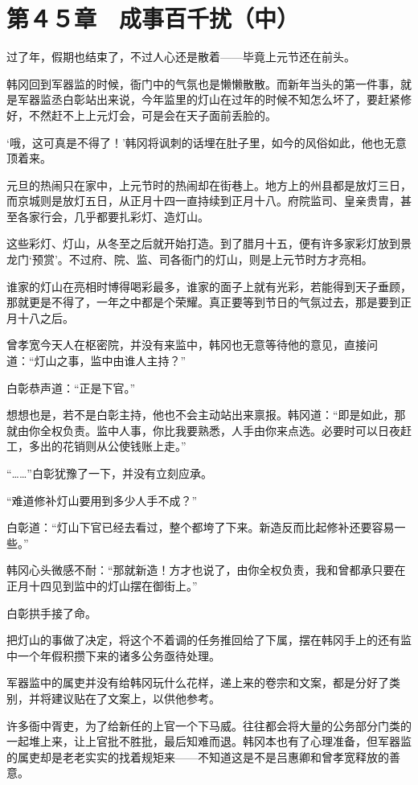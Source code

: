 \section{第４５章　成事百千扰（中）}

过了年，假期也结束了，不过人心还是散着——毕竟上元节还在前头。

韩冈回到军器监的时候，衙门中的气氛也是懒懒散散。而新年当头的第一件事，就是军器监丞白彰站出来说，今年监里的灯山在过年的时候不知怎么坏了，要赶紧修好，不然赶不上上元灯会，可是会在天子面前丢脸的。

‘哦，这可真是不得了！’韩冈将讽刺的话埋在肚子里，如今的风俗如此，他也无意顶着来。

元旦的热闹只在家中，上元节时的热闹却在街巷上。地方上的州县都是放灯三日，而京城则是放灯五日，从正月十四一直持续到正月十八。府院监司、皇亲贵胄，甚至各家行会，几乎都要扎彩灯、造灯山。

这些彩灯、灯山，从冬至之后就开始打造。到了腊月十五，便有许多家彩灯放到景龙门‘预赏’。不过府、院、监、司各衙门的灯山，则是上元节时方才亮相。

谁家的灯山在亮相时博得喝彩最多，谁家的面子上就有光彩，若能得到天子垂顾，那就更是不得了，一年之中都是个荣耀。真正要等到节日的气氛过去，那是要到正月十八之后。

曾孝宽今天人在枢密院，并没有来监中，韩冈也无意等待他的意见，直接问道：“灯山之事，监中由谁人主持？”

白彰恭声道：“正是下官。”

想想也是，若不是白彰主持，他也不会主动站出来禀报。韩冈道：“即是如此，那就由你全权负责。监中人事，你比我要熟悉，人手由你来点选。必要时可以日夜赶工，多出的花销则从公使钱账上走。”

“……”白彰犹豫了一下，并没有立刻应承。

“难道修补灯山要用到多少人手不成？”

白彰道：“灯山下官已经去看过，整个都垮了下来。新造反而比起修补还要容易一些。”

韩冈心头微感不耐：“那就新造！方才也说了，由你全权负责，我和曾都承只要在正月十四见到监中的灯山摆在御街上。”

白彰拱手接了命。

把灯山的事做了决定，将这个不着调的任务推回给了下属，摆在韩冈手上的还有监中一个年假积攒下来的诸多公务亟待处理。

军器监中的属吏并没有给韩冈玩什么花样，递上来的卷宗和文案，都是分好了类别，并将建议贴在了文案上，以供他参考。

许多衙中胥吏，为了给新任的上官一个下马威。往往都会将大量的公务部分门类的一起堆上来，让上官批不胜批，最后知难而退。韩冈本也有了心理准备，但军器监的属吏却是老老实实的找着规矩来——不知道这是不是吕惠卿和曾孝宽释放的善意。

